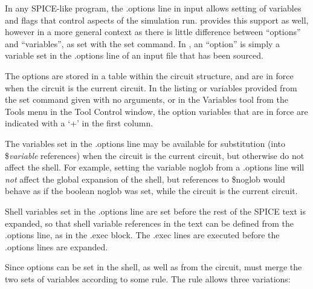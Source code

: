 In any SPICE-like program, the {\vt .options} line in input allows
setting of variables and flags that control aspects of the simulation
run.  {\WRspice} provides this support as well, however in a more
general context as there is little difference between ``options'' and
``variables'', as set with the {\cb set} command.  In {\WRspice}, an
``option'' is simply a variable set in the {\vt .options} line of an
input file that has been sourced.

The options are stored in a table within the circuit structure, and
are in force when the circuit is the current circuit.  In the listing
or variables provided from the {\cb set} command given with no
arguments, or in the {\cb Variables} tool from the {\cb Tools} menu in
the {\cb Tool Control} window, the option variables that are in force
are indicated with a `{\vt +}' in the first column.

The variables set in the {\vt .options} line may be available for
substitution (into {\vt \$}{\it variable} references) when the circuit
is the current circuit, but otherwise do not affect the shell.  For
example, setting the variable {\vt noglob} from a {\vt .options} line
will {\it not} affect the global expansion of the shell, but
references to {\vt \$noglob} would behave as if the boolean {\vt
noglob} was set, while the circuit is the current circuit.

Shell variables set in the {\vt .options} line are set before the rest
of the SPICE text is expanded, so that shell variable references in
the text can be defined from the {\vt .options} line, as in the {\vt
.exec} block.  The {\vt .exec} lines are executed before the {\vt
.options} lines are expanded.

Since options can be set in the shell, as well as from the circuit,
{\WRspice} must merge the two sets of variables according to some
rule.  The rule allows three variations:

